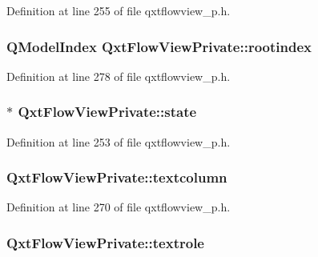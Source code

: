 Definition at line 255 of file qxtflowview\-\_\-p.\-h.

\hypertarget{class_qxt_flow_view_private_aaa70aeb770c8f206da9c546cba1e32fd}{
\subsubsection[{rootindex}]{\setlength{\rightskip}{0pt plus 5cm}Q\-Model\-Index Qxt\-Flow\-View\-Private\-::rootindex}}\label{class_qxt_flow_view_private_aaa70aeb770c8f206da9c546cba1e32fd}


Definition at line 278 of file qxtflowview\-\_\-p.\-h.

\hypertarget{class_qxt_flow_view_private_aa416bb9a3d10c7f318d1a33e5df3ca72}{
\subsubsection[{state}]{$\ast$ Qxt\-Flow\-View\-Private\-::state}}\label{class_qxt_flow_view_private_aa416bb9a3d10c7f318d1a33e5df3ca72}


Definition at line 253 of file qxtflowview\-\_\-p.\-h.

\hypertarget{class_qxt_flow_view_private_ab937d911c41ef46ad31c4305b751cb4a}{
\subsubsection[{textcolumn}]{ Qxt\-Flow\-View\-Private\-::textcolumn}}\label{class_qxt_flow_view_private_ab937d911c41ef46ad31c4305b751cb4a}


Definition at line 270 of file qxtflowview\-\_\-p.\-h.

\hypertarget{class_qxt_flow_view_private_a4c784cdb155f95f3ae6afa2bb38dda21}{
\subsubsection[{textrole}]{ Qxt\-Flow\-View\-Private\-::textrole}}\label{class_qxt_flow_view_private_a4c784cdb155f95f3ae6afa2bb38dda21}


